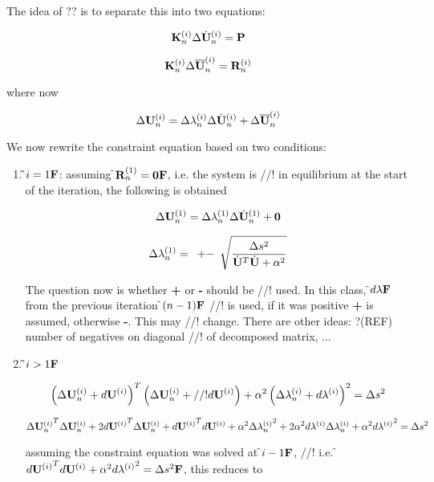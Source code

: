 \noindent The idea of ?? is to separate this into two equations:

\def\Uh{\dot{\bf U}}
\def\Ub{\overline{\bf U}}

\[
\K_n^{(i)} \Delta \Uh_n^{(i)} = \P
\]

\[
\K_n^{(i)} \Delta \Ub_n^{(i)} = \R_n^{(i)}
\]

\noindent where now

\begin{equation}
 \Delta \U_n^{(i)} = \Delta \lambda_n^{(i)} \Delta \Uh_n^{(i)} + \Delta \Ub_n^{(i)}  
\label{splitForm}
\end{equation}

\noindent We now rewrite the constraint equation based on two conditions:

\begin{enumerate}
\item {\bf \f$i = 1{\bf F}$}: assuming \f${\bf R}_n^{(1)} = {\bf 0}{\bf F}$, i.e. the system is
//! in equilibrium at the start of the iteration, the following is obtained

\[  \Delta \U_n^{(1)} = \Delta \lambda_n^{(1)} \Delta \Uh_n^{(1)} + \zero \]

\[ \Delta \lambda_n^{(1)} = \begin{array}{c} + - \end{array}
\sqrt{\frac{\Delta s^2}{\Uh^T \Uh + \alpha^2}} \]

\noindent The question now is whether {\bf +} or {\bf -} should be
//! used. In this class, \f$d \lambda{\bf F}$ from the previous iteration \f$(n-1){\bf F}$
//! is used, if it was positive {\bf +} is assumed, otherwise {\bf -}. This may
//! change. There are other ideas: ?(REF) number of negatives on diagonal
//! of decomposed matrix, ...

\item {\bf \f$i > 1{\bf F}$}

\[ \left( \Delta {\bf U}_n^{(i)} + d{\bf U}^{(i)} \right)^T \left( \Delta {\bf U}_n^{(i)} +
//! d{\bf U}^{(i)} \right) + \alpha^2 \left( \Delta \lambda_n^{(i)} + d\lambda^{(i)}
\right)^2 = \Delta s^2 \]

\[
\Delta {{\bf U}_n^{(i)}}^T\Delta {\bf U}_n^{(i)} + 2{d{\bf U}^{(i)}}^T\Delta {\bf U}_n^{(i)} + {d{\bf U}^{(i)}}^T d{\bf U}^{(i)}
+ \alpha^2 \Delta {\lambda_n^{(i)}}^2
+ 2 \alpha^2 d\lambda^{(i)} \Delta \lambda_n^{(i)} + \alpha^2 {d\lambda^{(i)}}^2
= \Delta s^2
\]

\noindent assuming the constraint equation was solved at \f$i-1{\bf F}$,
//! i.e. \f${d{\bf U}^{(i)}}^T d{\bf U}^{(i)} + \alpha^2 {d\lambda^{(i)}}^2 = \Delta s^2{\bf F}$, this reduces to


\end{enumerate}
